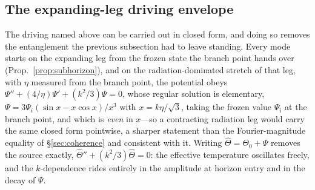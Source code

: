 \documentclass[11pt,a4paper]{article}
\theoremstyle{plain}
\theoremstyle{definition}
\theoremstyle{remark}
\begin{document}
\subsection{The expanding-leg driving envelope}\label{sec:envelope}
The driving named above can be carried out in closed form, and doing so removes the entanglement the previous
subsection had to leave standing. Every mode starts on the expanding leg from the frozen state the branch point
hands over (Prop.~\ref{prop:subhorizon}), and on the radiation-dominated stretch of that leg, with $\eta$ measured
from the branch point, the potential obeys
$\Psi''+(4/\eta)\Psi'+(k^{2}/3)\Psi=0$, whose regular solution is elementary,
$\Psi=3\Psi_{i}(\sin x-x\cos x)/x^{3}$ with $x=k\eta/\sqrt3$, taking the frozen value $\Psi_i$ at the branch
point, and which is \emph{even} in
$x$---so a contracting radiation leg would carry the same closed form pointwise, a
sharper statement than the Fourier-magnitude equality of \S\ref{sec:coherence} and consistent with it.
Writing $\hat\Theta=\Theta_{0}+\Psi$ removes the source exactly, $\hat\Theta''+(k^{2}/3)\hat\Theta=0$: the
effective temperature oscillates freely, and the $k$-dependence rides entirely in the amplitude at horizon
entry and in the decay of $\Psi$.
\end{document}
